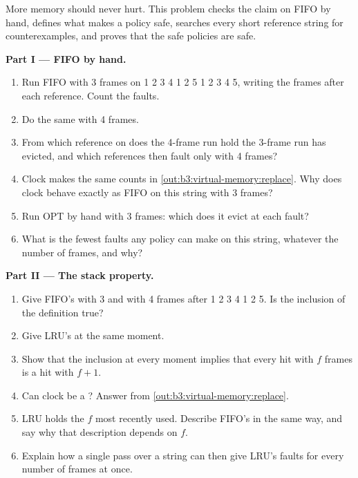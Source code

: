 \begin{problem}\label{pb:b3:virtual-memory:1}
More memory should never hurt. This problem checks the claim on FIFO by hand, defines what makes a policy safe, searches every short reference string for counterexamples, and proves that the safe policies are safe.

\label{lst:b3:virtual-memory:search}

\label{out:b3:virtual-memory:search}

\medskip\noindent\textbf{Part I --- FIFO by hand.}
\begin{enumerate}
\item Run FIFO with 3 frames on 1 2 3 4 1 2 5 1 2 3 4 5, writing the frames after each reference. Count the faults.
\item Do the same with 4 frames.
\item From which reference on does the 4-frame run hold  the 3-frame run has evicted, and which references then fault only with 4 frames?
\item Clock makes the same counts in \cref{out:b3:virtual-memory:replace}. Why does clock behave exactly as FIFO on this string with 3 frames?
\item Run OPT by hand with 3 frames: which  does it evict at each fault?
\item What is the fewest faults any policy can make on this string, whatever the number of frames, and why?
\end{enumerate}

\medskip\noindent\textbf{Part II --- The stack property.}
\begin{enumerate}[resume]
\item Give FIFO's  with 3 and with 4 frames after 1 2 3 4 1 2 5. Is the inclusion of the definition true?
\item Give LRU's  at the same moment.
\item Show that the inclusion at every moment implies that every hit with $f$ frames is a hit with $f + 1$.
\item Can clock be a ? Answer from \cref{out:b3:virtual-memory:replace}.
\item LRU holds the $f$  most recently used. Describe FIFO's  in the same way, and say why that description depends on $f$.
\item Explain how a single pass over a string can then give LRU's faults for every number of frames at once.
\end{enumerate}


\end{problem}
